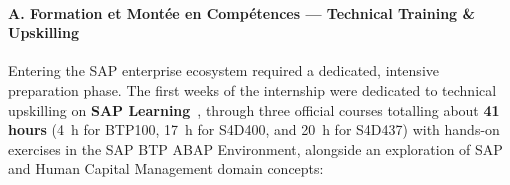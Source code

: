 \paragraph{A. Formation et Mont\'{e}e en Comp\'{e}tences --- Technical Training \& Upskilling}

Entering the SAP enterprise ecosystem required a dedicated, intensive preparation phase. The first weeks of the internship were dedicated to technical upskilling on \textbf{SAP Learning}~\cite{sap_learning}, through three official courses totalling about \textbf{41 hours} (4~h for BTP100, 17~h for S4D400, and 20~h for S4D437) with hands-on exercises in the SAP BTP ABAP Environment, alongside an exploration of SAP and Human Capital Management domain concepts:

